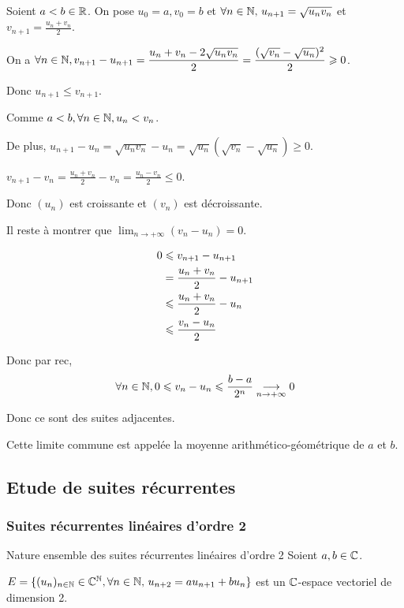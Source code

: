 \begin{exemple}
    Soient $a < b \in \mathbb{R}$. On pose $u_0 = a, v_0 = b$ 
    et $\forall n \in \mathbb{N}, \, u_{n+1} = \sqrt{u_n v_n}$ et $v_{n+1} = \frac{u_n + v_n} 2$.

    On a $\displaystyle \forall n \in \mathbb{N}, v_{n+1} - u_{n+1} = \frac{u_n + v_n -2 \sqrt{u_n v_n}} 2 = \frac{(\sqrt{v_n} - \sqrt{u_n})^2} 2 \geqslant 0$.

    Donc $u_{n + 1} \leqslant v_{n + 1}$.

    Comme $a < b, \forall n \in \mathbb{N}, u_n < v_n$.

    De plus, $u_{n + 1} - u_n = \sqrt{u_n v_n} - u_n = \sqrt{u_n}(\sqrt{v_n} - \sqrt{u_n}) \geqslant 0$.

    $v_{n + 1} - v_n = \frac{u_n + v_n} 2 - v_n = \frac{u_n - v_n} 2 \leqslant 0$.

    Donc $(u_n)$ est croissante et $(v_n)$ est décroissante.

    Il reste à montrer que $\lim_{n \to +\infty} (v_n - u_n) = 0$.

    \begin{align}
        0 & \leqslant  v_{n + 1} - u_{n + 1} \\
        \space & = \frac{u_n + v_n} 2 - u_{n + 1} \\
        \space &  \leqslant \frac{u_n + v_n} 2 - u_n \\
        \space & \leqslant \frac{v_n - u_n} 2 \\
    \end{align}
    

    Donc par rec, 
    $$\forall n \in \mathbb{N}, 0 \leqslant v_n - u_n \leqslant \frac{b - a}{2^n} \underset{n \to + \infty}{\longrightarrow} 0$$

    Donc ce sont des suites adjacentes.

    Cette limite commune est appelée la moyenne arithmético-géométrique de $a$ et $b$.
\end{exemple}

\subsection{Etude de suites récurrentes}
\subsubsection{Suites récurrentes linéaires d'ordre 2}

\begin{propositionnt}{Nature ensemble des suites récurrentes linéaires d'ordre 2}{}
    Soient $a, b \in \mathbb{C}$.  

    $E = \{(u_n)_{n \in \mathbb{N}} \in \mathbb{C}^{\mathbb{N}}, \forall n \in \mathbb{N}, \, u_{n + 2} = a u_{n + 1} + bu_n\}$ est 
    un $\mathbb{C}$-espace vectoriel de dimension 2. 
\end{propositionnt}

